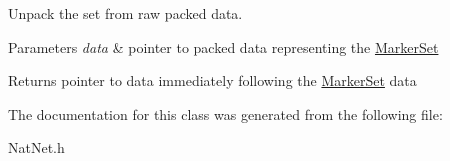 \-Unpack the set from raw packed data. 


\begin{DoxyParams}{\-Parameters}
{\em data} & pointer to packed data representing the \hyperlink{classMarkerSet}{\-Marker\-Set} \\
\hline
\end{DoxyParams}
\begin{DoxyReturn}{\-Returns}
pointer to data immediately following the \hyperlink{classMarkerSet}{\-Marker\-Set} data 
\end{DoxyReturn}


\-The documentation for this class was generated from the following file\-:\begin{DoxyCompactItemize}
\item 
\-Nat\-Net.\-h\end{DoxyCompactItemize}

